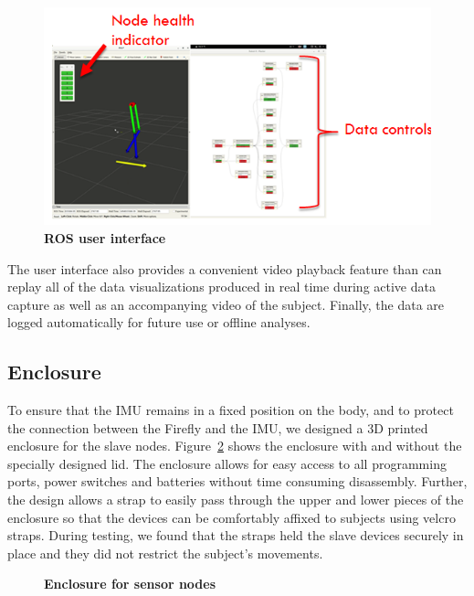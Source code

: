 \documentclass[conference]{IEEEtran}
\begin{document}
\begin{figure}[h]
  \centering
  \includegraphics[width=0.8\columnwidth]{figs/gui}
  \caption{{\bf ROS user interface}}
  \label{fig:gui}
\end{figure}
The user interface also provides a convenient video playback feature than can replay all
of the data visualizations produced in real time during active data capture as well as an
accompanying video of the subject. Finally, the data are logged automatically for future
use or offline analyses. 


\subsection{Enclosure} 
To ensure that the IMU remains in a fixed position on the body, and to protect the
connection between the Firefly and the IMU, we designed a 3D printed enclosure for the
slave nodes. Figure~\ref{fig:box} shows the enclosure with and without the specially designed
lid. The enclosure allows for easy access to all programming ports, power switches and
batteries without time consuming disassembly. Further, the design allows a strap to easily
pass through the upper and lower pieces of the enclosure so that the devices can be
comfortably affixed to subjects using velcro straps. During testing, we found that the
straps held the slave devices securely in place and they did not restrict the subject's
movements. 
\begin{figure}[h]
  \centering
  \label{fig:box}
  \caption{{\bf Enclosure for sensor nodes}}
\end{figure}
\end{document}
